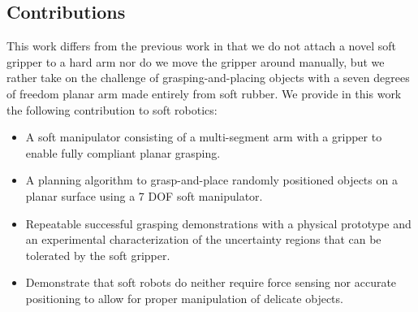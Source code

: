\subsection{Contributions}
This work differs from the previous work in that we %
do not attach a novel soft gripper to a hard arm nor do we move the gripper around manually, but we rather take on the challenge of grasping-and-placing objects with a seven degrees of freedom planar arm made entirely from soft rubber. 
We provide in this work the following contribution to soft robotics:
\begin{itemize}
  \item A soft manipulator consisting of a multi-segment arm with a gripper to enable fully compliant planar grasping.
  \item A planning algorithm to grasp-and-place randomly positioned objects on a planar surface using a 7 DOF soft manipulator.  
  \item Repeatable successful grasping demonstrations with a physical prototype and an experimental characterization of the uncertainty regions that can be tolerated by the soft gripper.
  \item Demonstrate that soft robots do neither require force sensing nor accurate positioning to allow for proper manipulation of delicate objects. 
\end{itemize}


